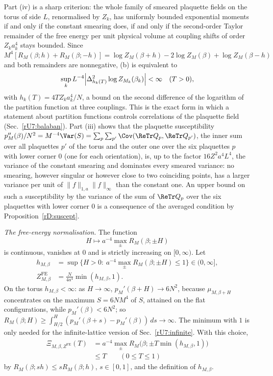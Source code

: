 \begin{remark}\label{rU7:torusremark}
Part (iv) is a sharp criterion: the whole family of smeared plaquette
fields on the torus of side $L$, renormalised by $Z_k$, has uniformly bounded
exponential moments if and only if the constant smearing does, if and only
if the second-order Taylor remainder of the free energy per unit physical
volume at coupling shifts of order $Z_ka_k^4$ stays bounded. Since
$M^4[R_M(\beta;h)+R_M(\beta;-h)]=\log Z_M(\beta+h)-2\log Z_M(\beta)+\log
Z_M(\beta-h)$ and both remainders are nonnegative, (b) is equivalent to
\[
\sup_kL^{-4}\Bigl|\Delta^2_{h_k(T)}\log Z_{M_k}(\beta_k)\Bigr|<\infty\quad
(T>0),
\]
with $h_k(T)=4TZ_ka_k^4/N$,
a bound on the second difference of the logarithm of the partition
function at three couplings. This is the exact form in which a statement
about partition functions controls correlations of the plaquette field
(Sec.~\ref{rU7:balaban}). Part (iii) shows that the plaquette susceptibility
$p_M''(\beta)/N^2=M^{-4}\Var(S)=\sum_{p}\sum_{p'}\Cov(\ReTr Q_p,\ReTr Q_{p'})$,
the inner sum over all plaquettes $p'$ of the torus and the outer one over
the six plaquettes $p$ with lower corner $0$ (one for each orientation), is,
up to the factor $16Z^2a^4L^4$, the variance of the constant smearing and dominates every
smeared variance: no smearing, however singular or however close to two
coinciding points, has a larger variance per unit of $\|f\|_{1,a}\|f\|_\infty$
than the constant one. An upper bound on such a susceptibility by the variance of the sum of
$\ReTr Q_p$ over the six plaquettes with lower corner $0$ is a consequence
of the averaged condition by Proposition~\ref{rD:suscept}.
\end{remark}

\emph{The free-energy normalisation.} The function
\[
H\mapsto a^{-4}\max_\pm R_M(\beta;\pm H)
\]
is continuous, vanishes at $0$ and is strictly increasing
on $[0,\infty)$. Let
\begin{align*}
h_{M,\beta}&=\sup\bigl\{H>0:\ a^{-4}\max_\pm R_M(\beta;\pm H)\le1\bigr\}\in
(0,\infty],\\
Z^{\mathrm{FE}}_{M,\beta}&=\frac N{4a^4}\min(h_{M,\beta},1).
\end{align*}
On the torus $h_{M,\beta}<\infty$: as $H\to\infty$, $p_M'(\beta+H)\to6N^2$,
because $\mu_{M,\beta+H}$ concentrates on the maximum $S=6NM^4$ of $S$,
attained on the flat configurations, while $p_M'(\beta)<6N^2$; so
$R_M(\beta;H)\ge\int_{H/2}^H(p_M'(\beta+s)-p_M'(\beta))\,ds\to\infty$. The
minimum with $1$ is only needed for the infinite-lattice version of
Sec.~\ref{rU7:infinite}. With this choice,
\begin{equation}
\begin{split}
\Xi_{M,\beta,Z^{\mathrm{FE}}}(T)&=a^{-4}\max_\pm R_M\bigl(\beta;\pm T\min(h_{M,
\beta},1)\bigr)\\
&\le T\qquad(0\le T\le1)
\end{split}
\tag{rU7.2}\label{rU7:xi}
\end{equation}
by $R_M(\beta;sh)\le sR_M(\beta;h)$, $s\in[0,1]$, and the definition of
$h_{M,\beta}$.

